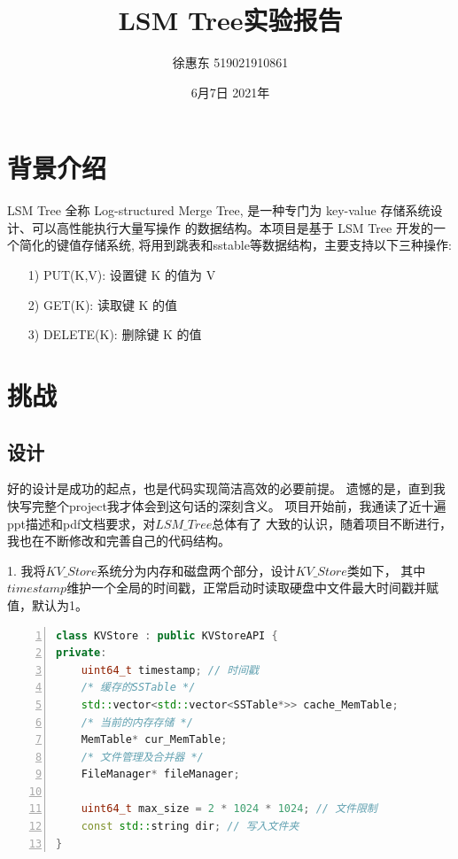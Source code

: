 \documentclass{article}
\title{LSM Tree实验报告}
\author{徐惠东 519021910861 }
\date{6月7日 2021年}
\begin{document}
\maketitle

\section{背景介绍}
LSM Tree 全称 Log-structured Merge Tree, 是一种专门为 key-value 存储系统设计、可以高性能执行大量写操作
的数据结构。本项目是基于 LSM Tree 开发的一个简化的键值存储系统, 将用到跳表和sstable等数据结构，主要支持以下三种操作:
\begin{itemize}
    \item [1)] 
    PUT(K,V): 设置键 K 的值为 V       
    \item [2)]
    GET(K): 读取键 K 的值
    \item [3)]
    DELETE(K): 删除键 K 的值
\end{itemize}


\section{挑战}
\subsection{设计}
好的设计是成功的起点，也是代码实现简洁高效的必要前提。
遗憾的是，直到我快写完整个project我才体会到这句话的深刻含义。
项目开始前，我通读了近十遍ppt描述和pdf文档要求，对$LSM\_Tree$总体有了
大致的认识，随着项目不断进行，我也在不断修改和完善自己的代码结构。\par

1. 我将$KV\_Store$系统分为内存和磁盘两个部分，设计$KV\_Store$类如下，
其中$timestamp$维护一个全局的时间戳，正常启动时读取硬盘中文件最大时间戳并赋值，默认为1。
\begin{lstlisting}[language = C++, numbers=left, 
  numberstyle=\tiny,frame=single]
class KVStore : public KVStoreAPI {
private:
    uint64_t timestamp; // 时间戳
    /* 缓存的SSTable */
    std::vector<std::vector<SSTable*>> cache_MemTable;
    /* 当前的内存存储 */
    MemTable* cur_MemTable;
    /* 文件管理及合并器 */
    FileManager* fileManager;

    uint64_t max_size = 2 * 1024 * 1024; // 文件限制
    const std::string dir; // 写入文件夹
}
\end{lstlisting}
\end{document}
